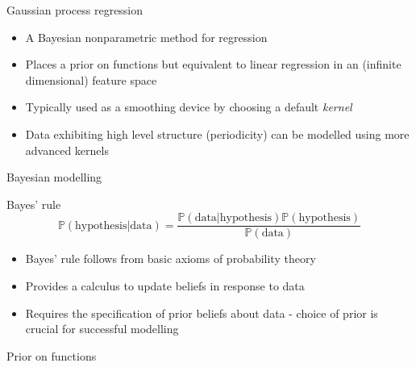 \begin{frame}{Gaussian process regression}
  \begin{itemize}
    \item A Bayesian nonparametric method for regression
    \vspace{\baselineskip}
    \item Places a prior on functions but equivalent to linear regression in an (infinite dimensional) feature space
    \vspace{\baselineskip}
    \item Typically used as a smoothing device by choosing a default \emph{kernel}
    \vspace{\baselineskip}
    \item Data exhibiting high level structure (\eg periodicity) can be modelled using more advanced kernels
  \end{itemize}
\end{frame}

\begin{frame}{Bayesian modelling}
  \begin{block}{Bayes' rule}
    \begin{equation*}
      \mathbb{P}(\textrm{hypothesis}|\textrm{data}) = \frac{\mathbb{P}(\textrm{data}|\textrm{hypothesis})\mathbb{P}(\textrm{hypothesis})}{\mathbb{P}(\textrm{data})}
    \end{equation*}
  \end{block}
  \begin{block}{}
    \begin{itemize}
      \item Bayes' rule follows from basic axioms of probability theory
      \vspace{\baselineskip}
      \item Provides a calculus to update beliefs in response to data
      \vspace{\baselineskip}
      \item Requires the specification of prior beliefs about data - choice of prior is crucial for successful modelling
    \end{itemize}
  \end{block}
\end{frame}

\begin{frame}{Prior on functions}
  \begin{centering}
    
  \end{centering}
\end{frame}

